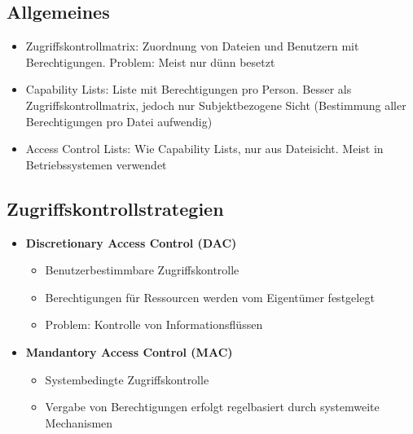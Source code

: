\subsection{Allgemeines}
\begin{itemize}
	\item Zugriffskontrollmatrix: Zuordnung von Dateien und Benutzern mit Berechtigungen. Problem: Meist nur dünn besetzt
	\item Capability Lists: Liste mit Berechtigungen pro Person. Besser als Zugriffskontrollmatrix, jedoch nur Subjektbezogene Sicht (Bestimmung aller Berechtigungen pro Datei aufwendig)
	\item Access Control Lists: Wie Capability Lists, nur aus Dateisicht. Meist in Betriebssystemen verwendet
\end{itemize}


\subsection{Zugriffskontrollstrategien}
\begin{itemize}
	\item \textbf{Discretionary Access Control (DAC)}
	\begin{itemize}
		\item Benutzerbestimmbare Zugriffskontrolle
		\item Berechtigungen für Ressourcen werden vom Eigentümer festgelegt
		\item Problem: Kontrolle von Informationsflüssen
	\end{itemize}
	\item \textbf{Mandantory Access Control (MAC)}
	\begin{itemize}
		\item Systembedingte Zugriffskontrolle
		\item Vergabe von Berechtigungen erfolgt regelbasiert durch systemweite Mechanismen
	\end{itemize}
\end{itemize}

